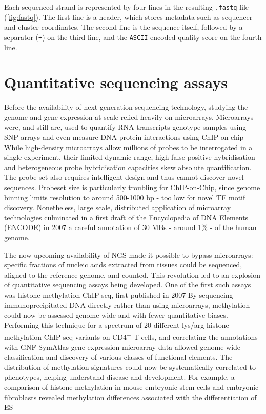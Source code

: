 Each sequenced strand is represented by four lines in the resulting \verb|.fastq| file (\autoref{fig:fastq}). The first line is a header, which stores metadata such as sequencer and cluster coordinates. The second line is the sequence itself, followed by a separator (\verb|+|) on the third line, and the \verb|ASCII|-encoded quality score on the fourth line.

\section{Quantitative sequencing assays}
\label{sect:sequencing_assays}
Before the availability of next-generation sequencing technology, studying the genome and gene expression at scale relied heavily on microarrays. Microarrays were, and still are, used to quantify RNA transcripts genotype samples using SNP arrays and even measure DNA-protein interactions using ChIP-on-chip While high-density microarrays allow millions of probes to be interrogated in a single experiment, their limited dynamic range, high false-positive hybridisation and heterogeneous probe hybridisation capacities skew absolute quantification. The probe set also requires intelligent design and thus cannot discover novel sequences. Probeset size is particularly troubling for ChIP-on-Chip, since genome binning limits resolution to around 500-1000 bp - too low for novel TF motif discovery. Nonetheless, large scale, distributed application of microarray technologies culminated in a first draft of the Encyclopedia of DNA Elements (ENCODE) in 2007 a careful annotation of 30 MBs - around 1\% - of the human genome.


The now upcoming availability of NGS made it possible to bypass microarrays: specific fractions of nucleic acids extracted from tissues could be sequenced, aligned to the reference genome, and counted. This revolution led to an explosion of quantitative sequencing assays being developed. One of the first such assays was histone methylation ChIP-seq, first published in 2007 By sequencing immunoprecipitated DNA directly rather than using microarrays, methylation could now be assessed genome-wide and with fewer quantitative biases. Performing this technique for a spectrum of 20 different lys/arg histone methylation ChIP-seq variants on CD4\textsuperscript{+} T cells, and correlating the annotations with GNF SymAtlas gene expression microarray data allowed genome-wide classification and discovery of various classes of functional elements. The distribution of methylation signatures could now be systematically correlated to phenotypes, helping understand disease and development. For example, a comparison of histone methylation in mouse embryonic stem cells and embryonic fibroblasts revealed methylation differences associated with the differentiation of ES

